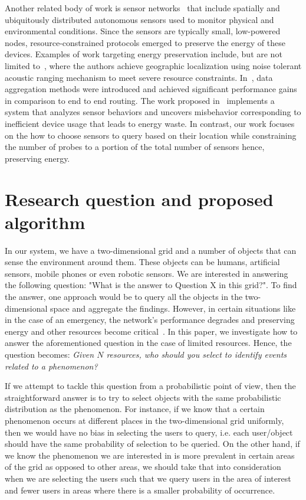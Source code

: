 \documentclass{acm_proc_article-sp}
\begin{document}
Another related body of work is sensor networks~\cite{akyildiz2002survey} that include spatially and ubiquitously distributed autonomous sensors used to monitor physical and environmental conditions. Since the sensors are typically small, low-powered nodes, resource-constrained protocols emerged to preserve the energy of these devices. Examples of work targeting energy preservation include, but are not limited to~\cite{sallai2004acoustic}, where the authors achieve geographic localization using noise tolerant acoustic ranging mechanism to meet severe resource constraints. In~\cite{krishnamachari2002impact}, data aggregation methods were introduced and achieved significant performance gains in comparison to end to end routing. The work proposed in~\cite{fontugne2013strip} implements a system that analyzes sensor behaviors and uncovers misbehavior corresponding to inefficient device usage that leads to energy waste. In contrast, our work focuses on the how to choose sensors to query based on their location while constraining the number of probes to a portion of the total number of sensors hence, preserving energy.



\section{Research question and proposed algorithm}
In our system, we have a two-dimensional grid and a number of objects that can sense the environment around them. These objects can be humans, artificial sensors, mobile phones or even robotic sensors. We are interested in answering the following question: "What is the answer to Question X in this grid?". To find the answer, one approach would be to query all the objects in the two-dimensional space and aggregate the findings. However, in certain situations like in the case of an emergency, the network's performance degrades and preserving energy and other resources become critical~\cite{manoj2007communication}. In this paper, we investigate how to answer the aforementioned question in the case of limited resources. Hence, the question becomes: \textit{Given $N$ resources, who should you select to identify events related to a phenomenon?}\par


If we attempt to tackle this question from a probabilistic point of view, then the straightforward answer is to try to select objects with the same probabilistic distribution as the phenomenon. For instance, if we know that a certain phenomenon occurs at different places in the two-dimensional grid uniformly, then we would have no bias in selecting the users to query, i.e. each user/object should have the same probability of selection to be queried. On the other hand, if we know the phenomenon we are interested in is more prevalent in certain areas of the grid as opposed to other areas, we should take that into consideration when we are selecting the users such that we query users in the area of interest and fewer users in areas where there is a smaller probability of occurrence.\par
\end{document}
